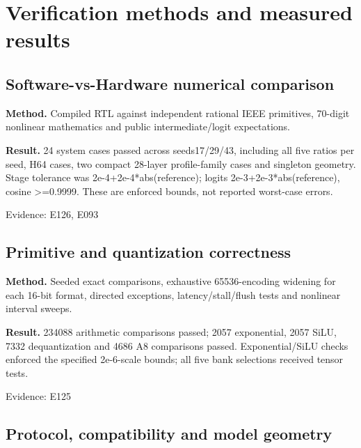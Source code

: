 \documentclass[11pt,a4paper]{article}
\begin{document}
\section{Verification methods and measured results}

\subsection{Software-vs-Hardware numerical comparison}

\textbf{Method.} Compiled RTL against independent rational IEEE primitives,\allowbreak{} 70-digit nonlinear mathematics and public intermediate/\allowbreak{}logit expectations.

\textbf{Result.} 24 system cases passed across seeds17/\allowbreak{}29/\allowbreak{}43,\allowbreak{} including all five ratios per seed,\allowbreak{} H64 cases,\allowbreak{} two compact 28-layer profile-family cases and singleton geometry. Stage tolerance was 2e-4+\allowbreak{}2e-4*\allowbreak{}abs(\allowbreak{}reference)\allowbreak{}; logits 2e-3+\allowbreak{}2e-3*\allowbreak{}abs(\allowbreak{}reference)\allowbreak{},\allowbreak{} cosine >=\allowbreak{}0.9999. These are enforced bounds,\allowbreak{} not reported worst-case errors.

{\small Evidence: E126,\allowbreak{} E093}

\subsection{Primitive and quantization correctness}

\textbf{Method.} Seeded exact comparisons,\allowbreak{} exhaustive 65536-encoding widening for each 16-bit format,\allowbreak{} directed exceptions,\allowbreak{} latency/\allowbreak{}stall/\allowbreak{}flush tests and nonlinear interval sweeps.

\textbf{Result.} 234088 arithmetic comparisons passed; 2057 exponential,\allowbreak{} 2057 SiLU,\allowbreak{} 7332 dequantization and 4686 A8 comparisons passed. Exponential/\allowbreak{}SiLU checks enforced the specified 2e-6-scale bounds; all five bank selections received tensor tests.

{\small Evidence: E125}

\subsection{Protocol,\allowbreak{} compatibility and model geometry}
\end{document}
